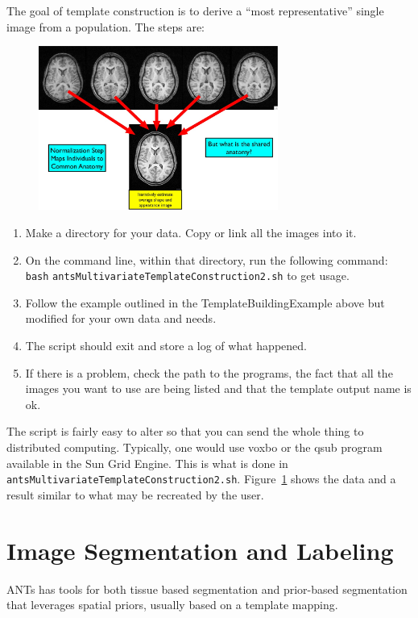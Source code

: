 \documentclass{InsightArticle}
\begin{document}
The goal of template construction is to derive a ``most representative'' single image from a population. 
The steps are: 
\begin{figure}
\center \includegraphics[width=0.7\textwidth]{Figures/templateex.jpg} 
\label{fig:template}
\end{figure}
\begin{enumerate}
\item   Make a directory for your data.   Copy or link all the images into it.
\item  On the command line, within that directory, run the following command: 
\texttt{bash}  \texttt{antsMultivariateTemplateConstruction2.sh}  to get usage. 
\item   Follow the example outlined in the TemplateBuildingExample
  above but modified for your own data and needs. 
\item The script should exit and store a log of what happened. 
\item If there is a problem, check the path to the programs, the fact that all the images you want to use are being 
listed and that the template output name is ok.  
\end{enumerate}
The script is fairly easy to alter so that you can send the whole thing to distributed computing. 
Typically, one would use voxbo or the qsub program available in the Sun Grid Engine.  This 
is what is done in \texttt{antsMultivariateTemplateConstruction2.sh}.  
Figure~\ref{fig:template} shows the data and a result similar to what may be recreated by the user.

\newpage
\section{Image Segmentation and Labeling}
ANTs has tools for both tissue based segmentation and prior-based segmentation that 
leverages spatial priors, usually based on a template mapping.  
\end{document}
